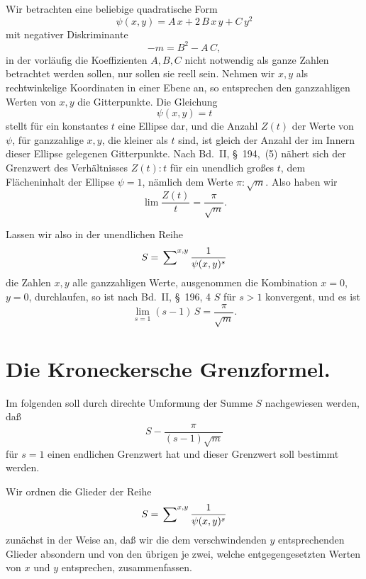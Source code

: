 \documentclass[12pt,a4paper]{article}
\theoremstyle{definition}
\begin{document}
Wir betrachten eine beliebige quadratische Form
\begin{equation}
\psi(x,y) = A\,x + 2\,B\,x\,y + C\,y^{2}
\end{equation}
mit negativer Diskriminante
\begin{equation}
-m = B^{2} - A\,C,
\end{equation}
in der vorläufig die Koeffizienten $A, B, C$ nicht notwendig als ganze 
Zahlen betrachtet werden sollen, nur sollen sie reell sein. Nehmen wir 
$x, y$ als rechtwinkelige Koordinaten in einer Ebene an, so entsprechen 
den ganzzahligen Werten von $x, y$ die Gitterpunkte. Die Gleichung
\[
\psi(x,y) = t
\]
stellt für ein konstantes $t$ eine Ellipse dar, und die Anzahl $Z(t)$ der 
Werte von $\psi$, für ganzzahlige $x, y$, die kleiner als $t$ sind, ist 
gleich der Anzahl der im Innern dieser Ellipse gelegenen Gitterpunkte. 
Nach Bd.~II, \S~194,~(5) nähert sich der Grenzwert des Verhältnisses 
$Z(t):t$ für ein unendlich großes $t$, dem Flächeninhalt der Ellipse 
$\psi = 1$, nämlich dem Werte $\pi:\sqrt{m}$. Also haben wir
\begin{equation}
\lim \frac{Z(t)}{t} = \frac{\pi}{\sqrt{m}}.
\end{equation}

Lassen wir also in der unendlichen Reihe
\begin{equation}
S = \sideset{}{^{x,y}}\sum \frac{1}{\psi(x,y)^{s}}
\end{equation}
die Zahlen $x, y$ alle ganzzahligen Werte, ausgenommen die Kombination 
$x = 0$, $y = 0$, durchlaufen, so ist nach Bd.~II, \S~196, 4 $S$ für 
$s > 1$ konvergent, und es ist
\begin{equation}
\lim_{s=1} (s-1)\,S = \frac{\pi}{\sqrt{m}}.
\end{equation}

\section{Die Kroneckersche Grenzformel.}

Im folgenden soll durch direchte Umformung der Summe $S$ nachgewiesen 
werden, daß
\[
S - \frac{\pi}{(s-1)\sqrt{m}}
\]
für $s = 1$ einen endlichen Grenzwert hat und dieser Grenzwert soll 
bestimmt werden.

Wir ordnen die Glieder der Reihe
\[
S = \sideset{}{^{x,y}}\sum \frac{1}{\psi(x,y)^{s}}
\]
zunächst in der Weise an, daß wir die dem verschwindenden $y$ 
entsprechenden Glieder absondern und von den übrigen je zwei, welche 
entgegengesetzten Werten von $x$ und $y$ entsprechen, zusammenfassen.
\end{document}
